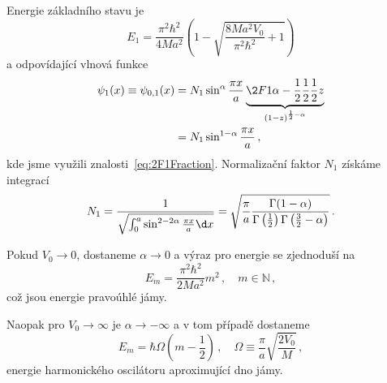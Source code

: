 \begin{solution}
	Energie základního stavu je
	\begin{equation}
		E_{1}=\frac{\pi^{2}\hbar^{2}}{4Ma^{2}}
			\left(1-\sqrt{\frac{8Ma^{2}V_{0}}{\pi^{2}\hbar^{2}}+1}\right)
	\end{equation}
	a odpovídající vlnová funkce
	\begin{align}
		\psi_{1}(x)\equiv\psi_{0,1}(x)
			&=N_{1}\sin^{\alpha}\frac{\pi x}{a}
				\underbrace{\2F1{\alpha-\frac{1}{2}}{\frac{1}{2}}{\frac{1}{2}}{z}}
					_{(1-z)^{\frac{1}{2}-\alpha}}\nonumber\\
			&=N_{1}\sin^{1-\alpha}\frac{\pi x}{a}\,,
	\end{align}
	kde jsme využili znalosti~\eqref{eq:2F1Fraction}.
	Normalizační faktor $N_{1}$ získáme integrací
	\begin{equation}
		N_{1}
			=\frac{1}{\sqrt{\int_{0}^{a}\sin^{2-2\alpha}\frac{\pi x}{a}\d x}}
			=\sqrt{\frac{\pi}{a}\frac{\Gamma(1-\alpha)}
				{\Gamma\left(\frac{1}{2}\right)\Gamma\left(\frac{3}{2}-\alpha\right)}}\,.
	\end{equation}
	
	\begin{note}
		Pokud $V_{0}\rightarrow0$, dostaneme $\alpha\rightarrow0$ a výraz pro energie se zjednoduší
		na
		\begin{equation}
			E_{m}=\frac{\pi^{2}\hbar^{2}}{2Ma^{2}}m^{2}\,,\quad m\in\mathbb{N}\,,
		\end{equation}
		což jsou energie pravoúhlé jámy.
		
		Naopak pro $V_{0}\rightarrow\infty$ je $\alpha\rightarrow-\infty$ a v tom případě dostaneme
		\begin{equation}
			E_{m}=\hbar\Omega\left(m-\frac{1}{2}\right)\,,
				\quad\Omega\equiv\frac{\pi}{a}\sqrt{\frac{2V_{0}}{M}}\,,
		\end{equation}
		energie harmonického oscilátoru aproximující dno jámy.
	\end{note}
\end{solution}
